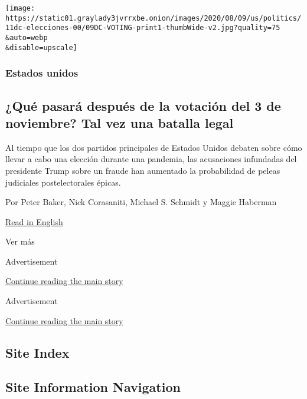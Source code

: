 \begin{enumerate}
  \texttt{[image: https://static01.graylady3jvrrxbe.onion/images/2020/08/09/us/politics/11dc-elecciones-00/09DC-VOTING-print1-thumbWide-v2.jpg?quality=75\\\&auto=webp\\\&disable=upscale]}

  \hypertarget{estados-unidos-2}{%
  \subsubsection{Estados unidos}\label{estados-unidos-2}}

  \hypertarget{quuxe9-pasaruxe1-despuuxe9s-de-la-votaciuxf3n-del-3-de-noviembre-tal-vez-una-batalla-legal}{%
  \subsection{¿Qué pasará después de la votación del 3 de noviembre? Tal
  vez una batalla
  legal}\label{quuxe9-pasaruxe1-despuuxe9s-de-la-votaciuxf3n-del-3-de-noviembre-tal-vez-una-batalla-legal}}

  Al tiempo que los dos partidos principales de Estados Unidos debaten
  sobre cómo llevar a cabo una elección durante una pandemia, las
  acusaciones infundadas del presidente Trump sobre un fraude han
  aumentado la probabilidad de peleas judiciales postelectorales épicas.

  Por Peter Baker, Nick Corasaniti, Michael S. Schmidt y Maggie Haberman

  \href{https://www.nytimes3xbfgragh.onion/2020/08/08/us/politics/voting-nov-3-election.html}{Read
  in English}
\end{enumerate}

Ver más

Advertisement

\protect\hyperlink{after-mid1}{Continue reading the main story}

Advertisement

\protect\hyperlink{after-mktg}{Continue reading the main story}

\hypertarget{site-index}{%
\subsection{Site Index}\label{site-index}}

\hypertarget{site-information-navigation}{%
\subsection{Site Information
Navigation}\label{site-information-navigation}}

